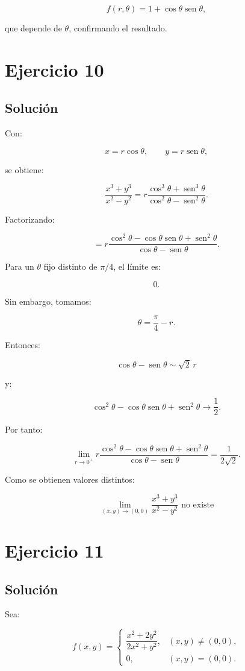 \documentclass[11pt,a4paper]{article}
\newcommand{\sen}{\operatorname{sen}}
\begin{document}
\[
f(r,\theta)
=
1+\cos\theta\sen\theta,
\]

que depende de \(\theta\), confirmando el resultado.

\section{Ejercicio 10}
\subsection{Solución}

Con:

\[
x=r\cos\theta,
\qquad
y=r\sen\theta,
\]

se obtiene:

\[
\frac{x^3+y^3}{x^2-y^2}
=
r
\frac{\cos^3\theta+\sen^3\theta}
{\cos^2\theta-\sen^2\theta}.
\]

Factorizando:

\[
=
r
\frac{\cos^2\theta-\cos\theta\sen\theta+\sen^2\theta}
{\cos\theta-\sen\theta}.
\]

Para un \(\theta\) fijo distinto de \(\pi/4\), el límite es:

\[
0.
\]

Sin embargo, tomamos:

\[
\theta=\frac{\pi}{4}-r.
\]

Entonces:

\[
\cos\theta-\sen\theta
\sim
\sqrt2\,r
\]

y:

\[
\cos^2\theta-\cos\theta\sen\theta+\sen^2\theta
\to
\frac12.
\]

Por tanto:

\[
\lim_{r\to0^+}
r
\frac{\cos^2\theta-\cos\theta\sen\theta+\sen^2\theta}
{\cos\theta-\sen\theta}
=
\frac1{2\sqrt2}.
\]

Como se obtienen valores distintos:

\[
\boxed{
\lim_{(x,y)\to(0,0)}
\frac{x^3+y^3}{x^2-y^2}
\text{ no existe}
}
\]

\section{Ejercicio 11}
\subsection{Solución}

Sea:

\[
f(x,y)
=
\begin{cases}
\dfrac{x^2+2y^2}{2x^2+y^2},
&
(x,y)\neq(0,0),\\[2mm]
0,
&
(x,y)=(0,0).
\end{cases}
\]
\end{document}
